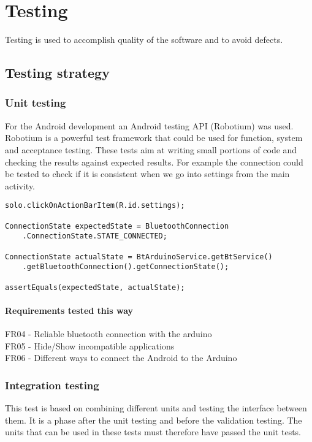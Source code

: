 \chapter{Testing}
	Testing is used to accomplish quality of the software and to avoid defects.
	
	\section{Testing strategy}
		\subsection{Unit testing}
			For the Android development an Android testing API (Robotium) was used.
			Robotium is a powerful test framework that could be used for function, system and acceptance testing.
			These tests aim at writing small portions of code and checking the results against expected results.
			For example the connection could be tested to check if it is consistent when we go into settings from the main activity.\\

			\begin{lstlisting}
solo.clickOnActionBarItem(R.id.settings);

ConnectionState expectedState = BluetoothConnection
	.ConnectionState.STATE_CONNECTED;
	
ConnectionState actualState = BtArduinoService.getBtService()
	.getBluetoothConnection().getConnectionState();

assertEquals(expectedState, actualState);
			\end{lstlisting}

			\subsubsection{Requirements tested this way}
			FR04 - Reliable bluetooth connection with the arduino\\
			FR05 - Hide/Show incompatible applications\\
			FR06 - Different ways to connect the Android to the Arduino\\

		\subsection{Integration testing}
			This test is based on combining different units and testing the interface between them. It is a phase after the unit testing and before the validation testing. The units that can be used in these tests must therefore have passed the unit tests.

